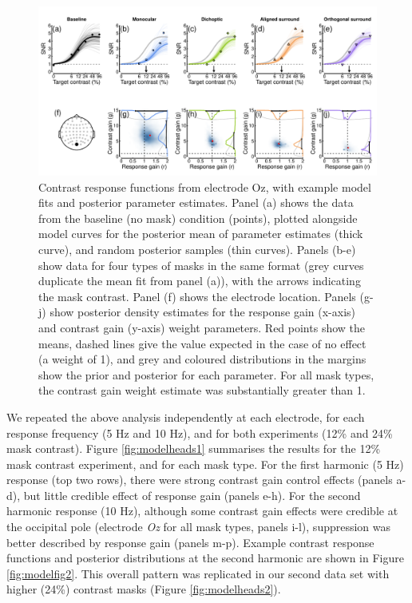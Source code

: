 \documentclass[]{article}
\begin{document}
\begin{figure}

{\centering \includegraphics{figures/modelfig1} 

}

\caption{Contrast response functions from electrode Oz, with example model fits and posterior parameter estimates. Panel (a) shows the data from the baseline (no mask) condition (points), plotted alongside model curves for the posterior mean of parameter estimates (thick curve), and random posterior samples (thin curves). Panels (b-e) show data for four types of masks in the same format (grey curves duplicate the mean fit from panel (a)), with the arrows indicating the mask contrast. Panel (f) shows the electrode location. Panels (g-j) show posterior density estimates for the response gain (x-axis) and contrast gain (y-axis) weight parameters. Red points show the means, dashed lines give the value expected in the case of no effect (a weight of 1), and grey and coloured distributions in the margins show the prior and posterior for each parameter. For all mask types, the contrast gain weight estimate was substantially greater than 1.}\label{fig:modelfig1}
\end{figure}

We repeated the above analysis independently at each electrode, for each response frequency (5 Hz and 10 Hz), and for both experiments (12\% and 24\% mask contrast). Figure \ref{fig:modelheads1} summarises the results for the 12\% mask contrast experiment, and for each mask type. For the first harmonic (5 Hz) response (top two rows), there were strong contrast gain control effects (panels a-d), but little credible effect of response gain (panels e-h). For the second harmonic response (10 Hz), although some contrast gain effects were credible at the occipital pole (electrode \emph{Oz} for all mask types, panels i-l), suppression was better described by response gain (panels m-p). Example contrast response functions and posterior distributions at the second harmonic are shown in Figure \ref{fig:modelfig2}. This overall pattern was replicated in our second data set with higher (24\%) contrast masks (Figure \ref{fig:modelheads2}).
\end{document}
